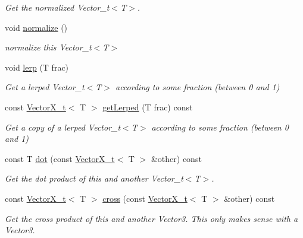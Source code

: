 \begin{DoxyCompactItemize}
\begin{DoxyCompactList}\small\item\em Get the normalized Vector\+\_\+t$<$\+T$>$. \end{DoxyCompactList}\item 
\mbox{\label{class_vector_x__t_a11fc8d9232f89ad0b572fcaff6895814}} 
void \hyperlink{class_vector_x__t_a11fc8d9232f89ad0b572fcaff6895814}{normalize} ()
\begin{DoxyCompactList}\small\item\em normalize this Vector\+\_\+t$<$\+T$>$ \end{DoxyCompactList}\item 
\mbox{\label{class_vector_x__t_abf57f54eabe52a159804689ccd80b9c4}} 
void \hyperlink{class_vector_x__t_abf57f54eabe52a159804689ccd80b9c4}{lerp} (T frac)
\begin{DoxyCompactList}\small\item\em Get a lerped Vector\+\_\+t$<$\+T$>$ according to some fraction (between 0 and 1) \end{DoxyCompactList}\item 
const \hyperlink{class_vector_x__t}{Vector\+X\+\_\+t}$<$ T $>$ \hyperlink{class_vector_x__t_a2b5339021a3287a60081537d0e0a75d7}{get\+Lerped} (T frac) const
\begin{DoxyCompactList}\small\item\em Get a copy of a lerped Vector\+\_\+t$<$\+T$>$ according to some fraction (between 0 and 1) \end{DoxyCompactList}\item 
const T \hyperlink{class_vector_x__t_a47edb26aa302ab3611ec850f56b1a0f0}{dot} (const \hyperlink{class_vector_x__t}{Vector\+X\+\_\+t}$<$ T $>$ \&other) const
\begin{DoxyCompactList}\small\item\em Get the dot product of this and another Vector\+\_\+t$<$\+T$>$. \end{DoxyCompactList}\item 
const \hyperlink{class_vector_x__t}{Vector\+X\+\_\+t}$<$ T $>$ \hyperlink{class_vector_x__t_a8384a54196c5416ccca9312a87f23321}{cross} (const \hyperlink{class_vector_x__t}{Vector\+X\+\_\+t}$<$ T $>$ \&other) const
\begin{DoxyCompactList}\small\item\em Get the cross product of this and another Vector3. This only makes sense with a Vector3. \end{DoxyCompactList}\item 

\end{DoxyCompactItemize}
